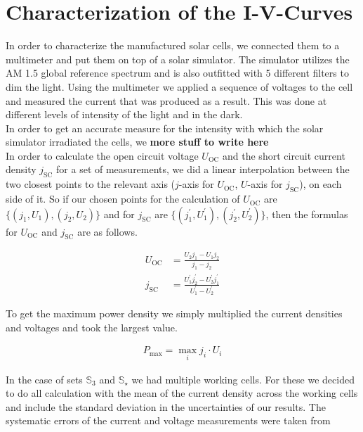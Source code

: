
\newcommand{\Uoc}{U_{\text{OC}}}
\newcommand{\jsc}{j_{\text{SC}}}
\newcommand{\Pmax}{P_{\text{max}}}

\section{Characterization of the I-V-Curves}\label{sec:charac}

In order to characterize the manufactured solar cells, we connected them to a multimeter and put them on top of a solar simulator. The simulator utilizes the AM 1.5 global reference spectrum and is also outfitted with 5 different filters to dim the light. Using the multimeter we applied a sequence of voltages to the cell and measured the current that was produced as a result. This was done at different levels of intensity of the light and in the dark.\\
In order to get an accurate measure for the intensity with which the solar simulator irradiated the cells, we \textbf{more stuff to write here}\\
In order to calculate the open circuit voltage $\Uoc$ and the short circuit current density $\jsc$ for a set of measurements, we did a linear interpolation between the two closest points to the relevant axis ($j$-axis for $\Uoc$, $U$-axis for $\jsc$), on each side of it. So if our chosen points for the calculation of $\Uoc$ are $\{(j_1,U_1),(j_2,U_2)\}$ and for $\jsc$ are $\{(j_1^\prime,U_1^\prime),(j_2^\prime,U_2^\prime)\}$, then the formulas for $\Uoc$ and $\jsc$ are as follows.

\begin{align}
\Uoc &= \frac{U_2 j_1 - U_1 j_2}{j_1-j_2}\\
\jsc &= \frac{U_1^\prime j_2^\prime - U_2^\prime j_1^\prime}{U_1^\prime-U_2^\prime}
\end{align}

To get the maximum power density we simply multiplied the current densities and voltages and took the largest value.

\begin{align}
\Pmax = \max_{i} j_i\cdot U_i
\end{align}

In the case of sets $\mathbb{S}_3$ and $\mathbb{S}_\star$ we had multiple working cells. For these we decided to do all calculation with the mean of the current density across the working cells and include the standard deviation in the uncertainties of our results. The systematic errors of the current and voltage measurements were taken from \cite{keithley}

